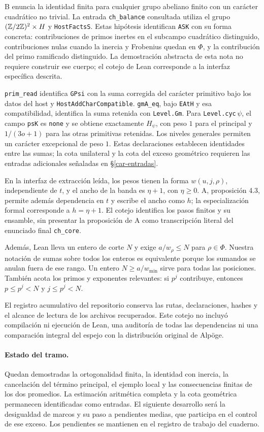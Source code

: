 B enuncia la identidad finita para cualquier grupo abeliano finito con un carácter cuadrático no trivial. La entrada \texttt{ch\_balance} consultada utiliza el grupo $(\mathbb{Z}/2\mathbb{Z})^2\times H$ y \texttt{HostFactsS}. Estas hipótesis identifican \texttt{ASK} con su forma concreta: contribuciones de primos inertes en el subcampo cuadrático distinguido, contribuciones nulas cuando la inercia y Frobenius quedan en $\Phi$, y la contribución del primo ramificado distinguido. La demostración abstracta de esta nota no requiere construir ese cuerpo; el cotejo de Lean corresponde a la interfaz específica descrita.

\texttt{prim\_read} identifica \texttt{GPsi} con la suma corregida del carácter primitivo bajo los datos del host y \texttt{HostAddCharCompatible}. \texttt{gmA\_eq}, bajo \texttt{EAtH} y esa compatibilidad, identifica la suma retenida con \texttt{Level.Gm}. Para \texttt{Level.cyc}\,$\psi$, el campo \texttt{psK} es \texttt{none} y se obtiene exactamente $H_\psi$, con peso $1$ para el principal y $1/(3o+1)$ para las otras primitivas retenidas. Los niveles generales permiten un carácter excepcional de peso $1$. Estas declaraciones establecen identidades entre las sumas; la cota unilateral y la cota del exceso geométrico requieren las entradas adicionales señaladas en §\ref{car-entradas}.

En la interfaz de extracción leída, los pesos tienen la forma $w(u,j,\rho)$, independiente de $t$, y el ancho de la banda es $\eta+1$, con $\eta\ge0$. A, proposición 4.3, permite además dependencia en $t$ y escribe el ancho como $h$; la especialización formal corresponde a $h=\eta+1$. El cotejo identifica los pasos finitos y su ensamble, sin presentar la proposición de A como transcripción literal del enunciado final \texttt{ch\_core}.

Además, Lean lleva un entero de corte $N$ y exige $a/w_\rho\le N$ para $\rho\in\Phi$. Nuestra notación de sumas sobre todos los enteros es equivalente porque los sumandos se anulan fuera de ese rango. Un entero $N\ge a/w_{\min}$ sirve para todas las posiciones. También acota los primos y exponentes relevantes: si $p^j$ contribuye, entonces $p\le p^j<N$ y $j\le p^j<N$.

El registro acumulativo del repositorio conserva las rutas, declaraciones, hashes y el alcance de lectura de los archivos recuperados. Este cotejo no incluyó compilación ni ejecución de Lean, una auditoría de todas las dependencias ni una comparación integral del espejo con la distribución original de Alpöge.

\paragraph{Estado del tramo.} Quedan demostradas la ortogonalidad finita, la identidad con inercia, la cancelación del término principal, el ejemplo local y las consecuencias finitas de los dos promedios. La estimación aritmética completa y la cota geométrica permanecen identificadas como entradas. El siguiente desarrollo será la desigualdad de marcos y su paso a pendientes medias, que participa en el control de ese exceso. Los pendientes se mantienen en el registro de trabajo del cuaderno.
\par
\endgroup
